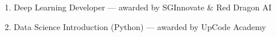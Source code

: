 

\begin{cvpubs}

  \cvpub
    {1.} %
    {Deep Learning Developer --- awarded by SGInnovate \& Red Dragon AI} %

  \cvpub
    {2.} %
    {Data Science Introduction (Python) --- awarded by UpCode Academy} %


\end{cvpubs}
